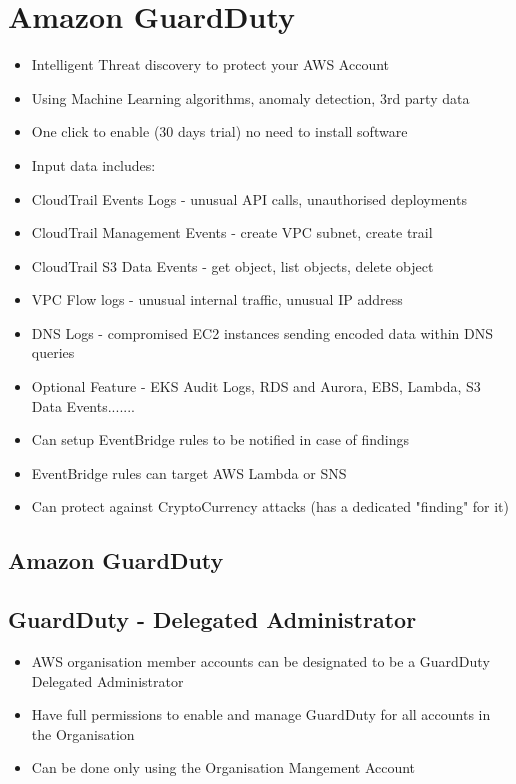 \section{Amazon GuardDuty}
\begin{itemize}
    \item Intelligent Threat discovery to protect your AWS Account
    \item Using Machine Learning algorithms, anomaly detection, 3rd party data
    \item One click to enable (30 days trial) no need to install software
    \item Input data includes:
    \item CloudTrail Events Logs - unusual API calls, unauthorised deployments
    \item CloudTrail Management Events - create VPC subnet, create trail
    \item CloudTrail S3 Data Events - get object, list objects, delete object
    \item VPC Flow logs - unusual internal traffic, unusual IP address
    \item DNS Logs - compromised EC2 instances sending encoded data within DNS queries
    \item Optional Feature - EKS Audit Logs, RDS and Aurora, EBS, Lambda, S3 Data Events.......
    \item Can setup EventBridge rules to be notified in case of findings
    \item EventBridge rules can target AWS Lambda or SNS
    \item Can protect against CryptoCurrency attacks (has a dedicated "finding" for it)
\end{itemize}

\subsection{Amazon GuardDuty}

\subsection{GuardDuty - Delegated Administrator}
\begin{itemize}
    \item AWS organisation member accounts can be designated to be a GuardDuty Delegated Administrator
    \item Have full permissions to enable and manage GuardDuty for all accounts in the Organisation
    \item Can be done only using the Organisation Mangement Account
\end{itemize}


